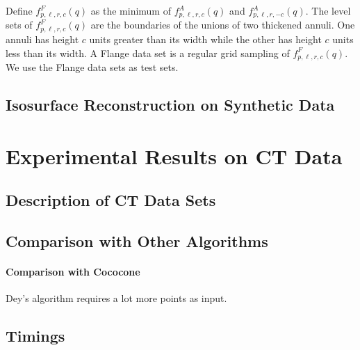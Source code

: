 Define $f^F_{p,\ell,r,c}(q)$ as the minimum
of $f^A_{p,\ell,r,c}(q)$ and $f^A_{p,\ell,r,-c}(q)$.
The level sets of $f^F_{p,\ell,r,c}(q)$ are the boundaries
of the unions of two thickened annuli.
One annuli has height $c$ units greater than its width
while the other has height $c$ units less than its width.
A Flange data set is a regular grid sampling of $f^F_{p,\ell,r,c}(q)$. 
We use the Flange data sets as test sets.


\subsection{Isosurface Reconstruction on Synthetic Data}

\section{Experimental Results on CT Data}

\subsection{Description of CT Data Sets}

\subsection{Comparison with Other Algorithms}
\paragraph{Comparison with Cococone}
Dey's algorithm requires a lot more points as input.
\subsection{Timings}

